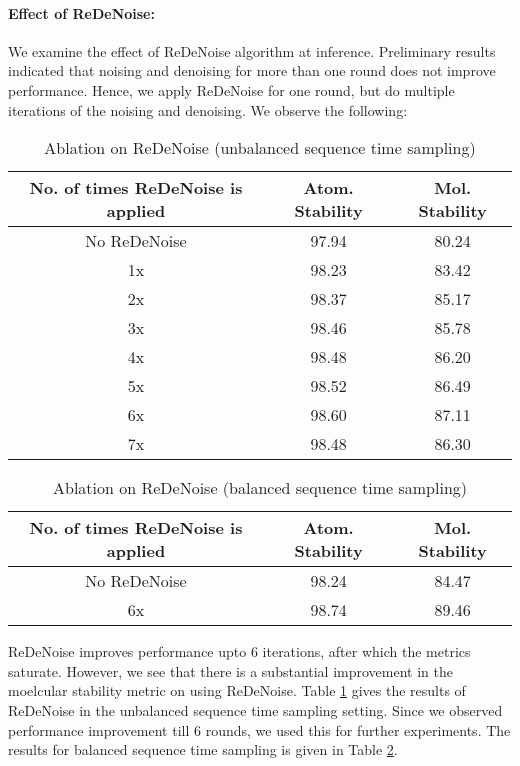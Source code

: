 \paragraph{Effect of ReDeNoise:}
We examine the effect of ReDeNoise algorithm at inference. Preliminary results indicated that noising and denoising for more than one round does not improve performance. Hence, we apply ReDeNoise for one round, but do multiple iterations of the noising and denoising. We observe the following:
\begin{table}[h]
    \centering
    \begin{tabular}{c c c}
    \toprule
  No. of times ReDeNoise is applied & Atom. Stability & Mol. Stability \\
  \midrule
  No ReDeNoise  &  97.94 & 80.24 \\
  1x & 98.23  & 83.42 \\
  2x & 98.37  & 85.17 \\
  3x & 98.46 & 85.78 \\
  4x  & 98.48 & 86.20 \\
  5x & 98.52 & 86.49 \\
  6x & 98.60 & 87.11 \\
  7x & 98.48 & 86.30 \\
  \bottomrule
\end{tabular}
    \caption{Ablation on ReDeNoise (unbalanced sequence time sampling)}
    \label{tab:abl_qm9_redenoise_unbalanced}
\end{table}
\begin{table}[!h]
    \centering
    \begin{tabular}{c c c}
    \toprule
  No. of times ReDeNoise is applied & Atom. Stability & Mol. Stability \\
  \midrule
  No ReDeNoise  &  98.24 & 84.47 \\
  6x  & 98.74 & 89.46 \\
  \bottomrule
\end{tabular}
    \caption{Ablation on ReDeNoise (balanced sequence time sampling)}
    \label{tab:abl_qm9_redenoise}
\end{table}
ReDeNoise improves performance upto 6 iterations, after which the metrics saturate. However, we see that there is a substantial improvement in the moelcular stability metric on using ReDeNoise. Table \ref{tab:abl_qm9_redenoise_unbalanced} gives the results of ReDeNoise in the unbalanced sequence time sampling setting. Since we observed performance improvement till $6$ rounds, we used this for further experiments. The results for balanced sequence time sampling is given in Table \ref{tab:abl_qm9_redenoise}.

